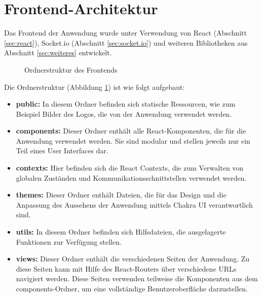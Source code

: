 \documentclass[a4paper,12pt]{report}
\begin{document}
    \section{Frontend-Architektur}
Das Frontend der Anwendung wurde unter Verwendung von React (Abschnitt \ref{sec:react}), Socket.io (Abschnitt \ref{sec:socket.io}) und weiteren Bibliotheken aus Abschnitt \ref{sec:weiteres} entwickelt.

\begin{figure}[h]
\centering

\begin{minipage}{0.6\textwidth}
\end{minipage}
\caption{Ordnerstruktur des Frontends}
\label{fig:frontend_dirtree}

\end{figure}

Die Ordnerstruktur (Abbildung \ref{fig:frontend_dirtree}) ist wie folgt aufgebaut:
\begin{itemize}
\item \textbf{public:} In diesem Ordner befinden sich statische Ressourcen, wie zum Beispiel Bilder des Logos, die von der Anwendung verwendet werden.
\item \textbf{components:} Dieser Ordner enthält alle React-Komponenten, die für die Anwendung verwendet werden. Sie sind modular und stellen jeweils nur ein Teil eines User Interfaces dar.
\item \textbf{contexts:} Hier befinden sich die React Contexts, die zum Verwalten von globalen Zuständen und Kommunikationsschnittstellen verwendet werden.
\item \textbf{themes:} Dieser Ordner enthält Dateien, die für das Design und die Anpassung des Aussehens der Anwendung mittels Chakra UI verantwortlich sind.
\item \textbf{utils:} In diesem Ordner befinden sich Hilfsdateien, die ausgelagerte Funktionen zur Verfügung stellen.
\item \textbf{views:} Dieser Ordner enthält die verschiedenen Seiten der Anwendung. Zu diese Seiten kann mit Hilfe des React-Routers über verschiedene URLs navigiert werden. Diese Seiten verwenden teilweise die Komponenten aus dem components-Ordner, um eine vollständige Benutzeroberfläche darzustellen.
\end{itemize}
    
\end{document}
